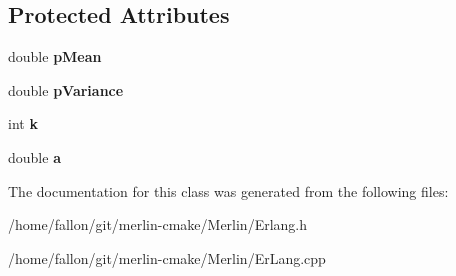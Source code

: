 \subsection*{Protected Attributes}
\begin{DoxyCompactItemize}
\item 
\mbox{\label{classErlang_a373327bbb8dc48b8b390ee19d96af06d}} 
double {\bfseries p\+Mean}
\item 
\mbox{\label{classErlang_ab69812fc063c419e6a50e247e8312d4c}} 
double {\bfseries p\+Variance}
\item 
\mbox{\label{classErlang_a037def7df09de60747b50ce6dea16338}} 
int {\bfseries k}
\item 
\mbox{\label{classErlang_a14507d83b15e9e91445e4ef4793ef1b6}} 
double {\bfseries a}
\end{DoxyCompactItemize}


The documentation for this class was generated from the following files\+:\begin{DoxyCompactItemize}
\item 
/home/fallon/git/merlin-\/cmake/\+Merlin/Erlang.\+h\item 
/home/fallon/git/merlin-\/cmake/\+Merlin/Er\+Lang.\+cpp\end{DoxyCompactItemize}
